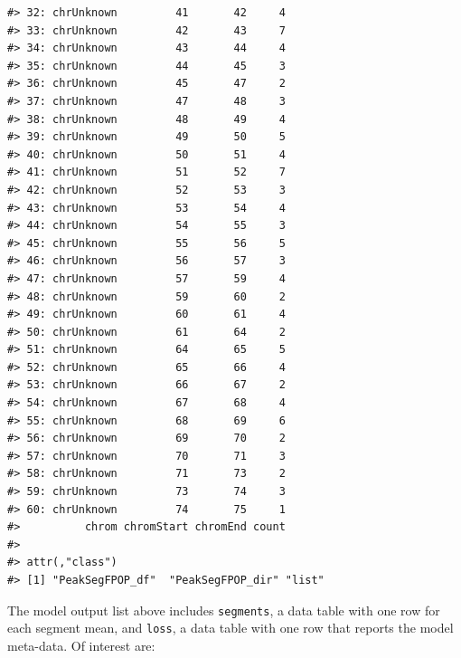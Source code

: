\documentclass[12pt]{article}\usepackage[]{graphicx}\usepackage[]{color}
\makeatletter
\newenvironment{kframe}{%
 \def\at@end@of@kframe{}%
 \ifinner\ifhmode%
  \def\at@end@of@kframe{\end{minipage}}%
  \begin{minipage}{\columnwidth}%
 \fi\fi%
 \def\FrameCommand##1{\hskip\@totalleftmargin \hskip-\fboxsep
 \colorbox{shadecolor}{##1}\hskip-\fboxsep
     \hskip-\linewidth \hskip-\@totalleftmargin \hskip\columnwidth}%
 \MakeFramed {\advance\hsize-\width
   \@totalleftmargin\z@ \linewidth\hsize
   \@setminipage}}%
 {\par\unskip\endMakeFramed%
 \at@end@of@kframe}
\newenvironment{knitrout}{}{} %
\makeatother
\begin{document}
\begin{knitrout}
\begin{kframe}
\begin{verbatim}
#> 32: chrUnknown         41       42     4
#> 33: chrUnknown         42       43     7
#> 34: chrUnknown         43       44     4
#> 35: chrUnknown         44       45     3
#> 36: chrUnknown         45       47     2
#> 37: chrUnknown         47       48     3
#> 38: chrUnknown         48       49     4
#> 39: chrUnknown         49       50     5
#> 40: chrUnknown         50       51     4
#> 41: chrUnknown         51       52     7
#> 42: chrUnknown         52       53     3
#> 43: chrUnknown         53       54     4
#> 44: chrUnknown         54       55     3
#> 45: chrUnknown         55       56     5
#> 46: chrUnknown         56       57     3
#> 47: chrUnknown         57       59     4
#> 48: chrUnknown         59       60     2
#> 49: chrUnknown         60       61     4
#> 50: chrUnknown         61       64     2
#> 51: chrUnknown         64       65     5
#> 52: chrUnknown         65       66     4
#> 53: chrUnknown         66       67     2
#> 54: chrUnknown         67       68     4
#> 55: chrUnknown         68       69     6
#> 56: chrUnknown         69       70     2
#> 57: chrUnknown         70       71     3
#> 58: chrUnknown         71       73     2
#> 59: chrUnknown         73       74     3
#> 60: chrUnknown         74       75     1
#>          chrom chromStart chromEnd count
#> 
#> attr(,"class")
#> [1] "PeakSegFPOP_df"  "PeakSegFPOP_dir" "list"
\end{verbatim}
\end{kframe}
\end{knitrout}


The model output list above includes \verb|segments|, a data table with
one row for each segment mean, and \verb|loss|, a data table with one
row that reports the model meta-data. Of interest are:
\end{document}
